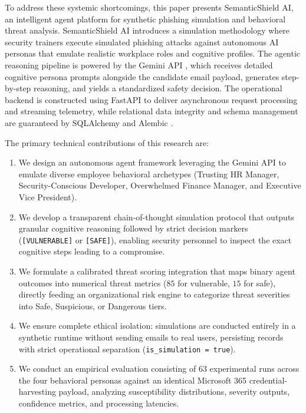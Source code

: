 \documentclass[conference,letterpaper]{IEEEtran}
\begin{document}
To address these systemic shortcomings, this paper presents SemanticShield AI, an intelligent agent platform for synthetic phishing simulation and behavioral threat analysis. SemanticShield AI introduces a simulation methodology where security trainers execute simulated phishing attacks against autonomous AI personas that emulate realistic workplace roles and cognitive profiles. The agentic reasoning pipeline is powered by the Gemini API \cite{gemini2024}, which receives detailed cognitive persona prompts alongside the candidate email payload, generates step-by-step reasoning, and yields a standardized safety decision. The operational backend is constructed using FastAPI \cite{fastapi2024} to deliver asynchronous request processing and streaming telemetry, while relational data integrity and schema management are guaranteed by SQLAlchemy and Alembic \cite{sqlalchemy2024}.

The primary technical contributions of this research are:
\begin{enumerate}
    \item We design an autonomous agent framework leveraging the Gemini API \cite{gemini2024} to emulate diverse employee behavioral archetypes (Trusting HR Manager, Security-Conscious Developer, Overwhelmed Finance Manager, and Executive Vice President).
    \item We develop a transparent chain-of-thought simulation protocol that outputs granular cognitive reasoning followed by strict decision markers (\texttt{[VULNERABLE]} or \texttt{[SAFE]}), enabling security personnel to inspect the exact cognitive steps leading to a compromise.
    \item We formulate a calibrated threat scoring integration that maps binary agent outcomes into numerical threat metrics ($85$ for vulnerable, $15$ for safe), directly feeding an organizational risk engine to categorize threat severities into Safe, Suspicious, or Dangerous tiers.
    \item We ensure complete ethical isolation: simulations are conducted entirely in a synthetic runtime without sending emails to real users, persisting records with strict operational separation (\texttt{is\_simulation = true}).
    \item We conduct an empirical evaluation consisting of 63 experimental runs across the four behavioral personas against an identical Microsoft 365 credential-harvesting payload, analyzing susceptibility distributions, severity outputs, confidence metrics, and processing latencies.
\end{enumerate}
\end{document}
